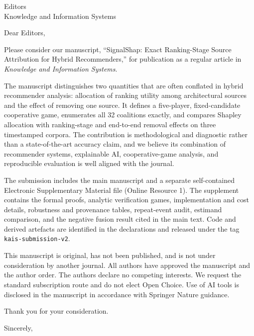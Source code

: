 \documentclass[11pt]{letter}
\date{21 August 2026}
\begin{document}
\begin{letter}{Editors\\Knowledge and Information Systems}
\opening{Dear Editors,}

Please consider our manuscript, ``SignalShap: Exact Ranking-Stage Source
Attribution for Hybrid Recommenders,''
for publication as a regular article in \emph{Knowledge and Information
Systems}.

The manuscript distinguishes two quantities that are often conflated in
hybrid recommender analysis: allocation of ranking utility among architectural
sources and the effect of removing one source. It defines a five-player,
fixed-candidate cooperative game, enumerates all 32 coalitions exactly, and
compares Shapley allocation with ranking-stage and end-to-end removal effects
on three timestamped corpora. The contribution is methodological and
diagnostic rather than a state-of-the-art accuracy claim, and we believe its
combination of recommender systems, explainable AI, cooperative-game analysis,
and reproducible evaluation is well aligned with the journal.

The submission includes the main manuscript and a separate self-contained
Electronic Supplementary Material file (Online Resource 1). The supplement
contains the formal proofs, analytic verification games, implementation and
cost details, robustness and provenance tables, repeat-event audit, estimand
comparison, and the negative fusion result cited in the main text. Code and
derived artefacts are identified in the declarations and released under the
tag \texttt{kais-submission-v2}.

This manuscript is original, has not been published, and is not under
consideration by another journal. All authors have approved the manuscript and
the author order. The authors declare no competing interests. We request the
standard subscription route and do not elect Open Choice. Use of AI tools is
disclosed in the manuscript in accordance with Springer Nature guidance.

Thank you for your consideration.

\closing{Sincerely,}
\end{letter}
\end{document}
